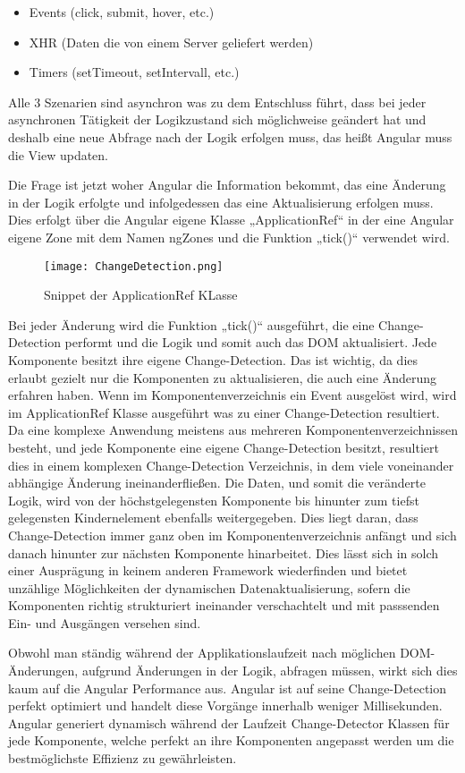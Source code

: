 \begin{itemize}
\item Events (click, submit, hover, etc.)
\item	XHR (Daten die von einem Server geliefert werden)
\item	Timers (setTimeout, setIntervall, etc.)
\end{itemize}
Alle 3 Szenarien sind asynchron was zu dem Entschluss führt, dass bei jeder asynchronen Tätigkeit der Logikzustand sich möglichweise geändert hat und deshalb eine neue Abfrage nach der Logik erfolgen muss, das heißt Angular muss die View updaten.

Die Frage ist jetzt woher Angular die Information bekommt, das eine Änderung in der Logik erfolgte und infolgedessen das eine Aktualisierung erfolgen muss. Dies erfolgt über die Angular eigene Klasse „ApplicationRef“ in der eine Angular eigene Zone mit dem Namen ngZones und die Funktion „tick()“ verwendet wird.
\begin{figure}[H] \centering \texttt{[image: ChangeDetection.png]} \caption{Snippet der ApplicationRef KLasse} \end{figure}
Bei jeder Änderung wird die Funktion „tick()“ ausgeführt, die eine Change-Detection performt und die Logik und somit auch das DOM aktualisiert.
Jede Komponente besitzt ihre eigene Change-Detection. Das ist wichtig, da dies erlaubt gezielt nur die Komponenten zu aktualisieren, die auch eine Änderung erfahren haben. Wenn im Komponentenverzeichnis ein Event ausgelöst wird, wird im ApplicationRef Klasse  ausgeführt was zu einer  Change-Detection resultiert. Da eine komplexe Anwendung meistens aus mehreren Komponentenverzeichnissen besteht, und jede Komponente eine eigene Change-Detection besitzt, resultiert dies in einem komplexen Change-Detection Verzeichnis, in dem viele voneinander abhängige Änderung ineinanderfließen. Die Daten, und somit die veränderte Logik, wird von der höchstgelegensten Komponente bis hinunter zum tiefst gelegensten Kindernelement ebenfalls weitergegeben. Dies liegt daran, dass Change-Detection immer ganz oben im Komponentenverzeichnis anfängt und sich danach hinunter zur nächsten Komponente hinarbeitet. Dies lässt sich in solch einer Ausprägung in keinem anderen Framework wiederfinden und bietet unzählige Möglichkeiten der dynamischen Datenaktualisierung, sofern die Komponenten richtig strukturiert ineinander verschachtelt und mit passsenden Ein- und Ausgängen versehen sind.

Obwohl man ständig während der Applikationslaufzeit nach möglichen DOM-Änderungen, aufgrund Änderungen in der Logik, abfragen müssen, wirkt sich dies kaum auf die Angular Performance aus. Angular ist auf seine Change-Detection perfekt optimiert und handelt diese Vorgänge innerhalb weniger Millisekunden.
Angular generiert dynamisch während der Laufzeit Change-Detector Klassen für jede Komponente, welche perfekt an ihre Komponenten angepasst werden um die bestmöglichste Effizienz zu gewährleisten.
